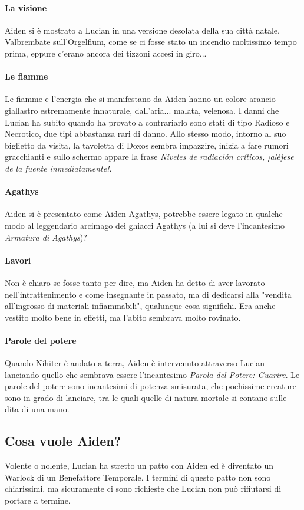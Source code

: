 \documentclass[letterpaper,twocolumn,openany,nodeprecatedcode]{dndbook}
\begin{document}
\paragraph{La visione} Aiden si è mostrato a Lucian in una versione desolata della sua città natale, Valbrembate sull'Orgelflum, come se ci fosse stato un incendio moltissimo tempo prima, eppure c'erano ancora dei tizzoni accesi in giro...
\paragraph{Le fiamme} Le fiamme e l'energia che si manifestano da Aiden hanno un colore arancio-giallastro estremamente innaturale, dall'aria... malata, velenosa. I danni che Lucian ha subito quando ha provato a contrariarlo sono stati di tipo Radioso e Necrotico, due tipi abbastanza rari di danno. Allo stesso modo, intorno al suo biglietto da visita, la tavoletta di Doxos sembra impazzire, inizia a fare rumori gracchianti e sullo schermo appare la frase \textit{Niveles de radiación críticos, ¡aléjese de la fuente inmediatamente!}.
\paragraph{Agathys} Aiden si è presentato come Aiden Agathys, potrebbe essere legato in qualche modo al leggendario arcimago dei ghiacci Agathys (a lui si deve l'incantesimo \textit{Armatura di Agathys})?
\paragraph{Lavori} Non è chiaro se fosse tanto per dire, ma Aiden ha detto di aver lavorato nell'intrattenimento e come insegnante in passato, ma di dedicarsi alla "vendita all'ingrosso di materiali infiammabili", qualunque cosa significhi. Era anche vestito molto bene in effetti, ma l'abito sembrava molto rovinato.
\paragraph{Parole del potere} Quando Nihiter è andato a terra, Aiden è intervenuto attraverso Lucian lanciando quello che sembrava essere l'incantesimo \textit{Parola del Potere: Guarire}. Le parole del potere sono incantesimi di potenza smisurata, che pochissime creature sono in grado di lanciare, tra le quali quelle di natura mortale si contano sulle dita di una mano.

\subsection{Cosa vuole Aiden?}
Volente o nolente, Lucian ha stretto un patto con Aiden ed è diventato un Warlock di un Benefattore Temporale. I termini di questo patto non sono chiarissimi, ma sicuramente ci sono richieste che Lucian non può rifiutarsi di portare a termine.
\end{document}
